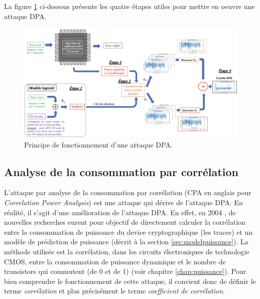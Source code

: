 \documentclass[oneside]{book}
\begin{document}
\hspace{-0.5 cm} La figure \ref{fig:DPA} ci-dessous présente les quatre étapes utiles pour mettre en oeuvre une attaque DPA.
\begin{figure}[htbp]
    \hspace{-1cm}
    \includegraphics[scale=0.52]{image/DPA}
    \caption{Principe de fonctionnement d'une attaque DPA.}
    \label{fig:DPA}
\end{figure}


\vspace{-0.45cm}\subsection{Analyse de la consommation par corrélation}
\label{sec:CPA}

\vspace{-0.05cm}L'attaque par analyse de la consommation par corrélation (CPA en anglais pour \textit{Correlation Power Analysis}) \cite{hutchison_correlation_2004} est une attaque qui dérive de l’attaque DPA. En réalité, il s'agit d'une amélioration de l'attaque DPA. En effet, en 2004 \cite{didact_approche}, de nouvelles recherches eurent pour objectif de directement calculer la corrélation entre la consommation de puissance du device cryptographique (les traces) et un modèle de prédiction de puissance (décrit à la section \ref{sec:modelpuissance}). La méthode utilisée est la corrélation, dans les circuits électroniques de technologie CMOS, entre la consommation de puissance dynamique et le nombre de transistors qui commutent (de 0 et de 1) (voir chapitre \ref{chap:puissance}). Pour bien comprendre le fonctionnement de cette attaque, il convient donc de définir le terme \textit{corrélation} et plus précisément le terme \textit{coefficient de corrélation}.
\end{document}
